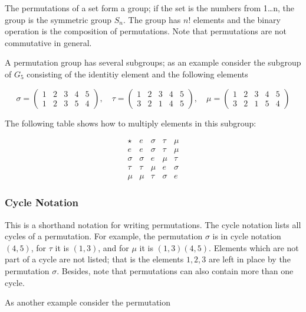 The permutations of a set form a group; if the set is the numbers from
1\ldots{}n, the group is the symmetric group \(S_n\). The group has
\(n!\) elements and the binary operation is the composition of
permutations. Note that permutations are not commutative in general.

A permutation group has several subgroups; as an example consider the
subgroup of \(G_5\) consisting of the identitiy element and the
following elements

\[
\sigma =
\begin{pmatrix}
1 & 2 & 3 & 4 & 5 \\
1 & 2 & 3 & 5 & 4
\end{pmatrix}
,\quad \tau = 
\begin{pmatrix}
1 & 2 & 3 & 4 & 5 \\
3 & 2 & 1 & 4 & 5
\end{pmatrix}
, \quad \mu = 
\begin{pmatrix}
1 & 2 & 3 & 4 & 5 \\
3 & 2 & 1 & 5 & 4
\end{pmatrix}
\]

The following table shows how to multiply elements in this subgroup:

\[
\begin{array}{c|cccc}
\star   & e     & \sigma & \tau   & \mu    \\
\hline
e     & e     & \sigma & \tau   & \mu    \\
\sigma & \sigma & e     & \mu    & \tau   \\
\tau   & \tau   & \mu    & e     & \sigma \\
\mu    & \mu    & \tau   & \sigma & e
\end{array}
\]

\subsubsection{Cycle Notation}\label{cycle-notation}

This is a shorthand notation for writing permutations. The cycle
notation lists all cycles of a permutation. For example, the permutation
\(\sigma\) is in cycle notation \((4,5)\), for \(\tau\) it is \((1,3)\),
and for \(\mu\) it is \((1,3)(4,5)\). Elements which are not part of a
cycle are not listed; that is the elements \(1,2,3\) are left in place
by the permutation \(\sigma\). Besides, note that permutations can also
contain more than one cycle.

As another example consider the permutation


